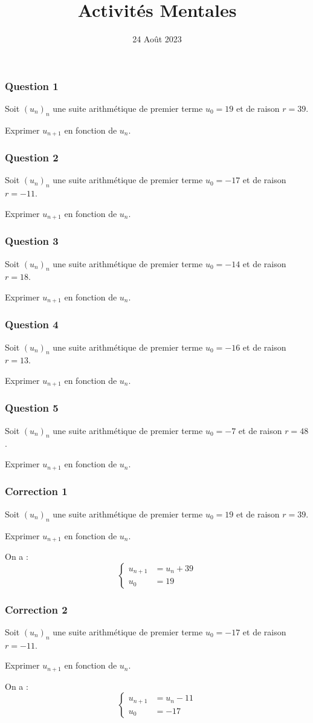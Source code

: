\documentclass[15pt, mathserif]{beamer}
\title{Activités Mentales}
\date{24 Août 2023}
\begin{document}
\begin{frame}
    \titlepage
\end{frame}

\begin{frame} 
	\frametitle{Question 1}
Soit $(u_n)_n$ une suite arithmétique de premier terme $u_0=19$ et de raison $r=39$. 
 
 Exprimer $u_{n+1}$ en fonction de $u_n$.\end{frame}


\begin{frame} 
	\frametitle{Question 2}
Soit $(u_n)_n$ une suite arithmétique de premier terme $u_0=-17$ et de raison $r=-11$. 
 
 Exprimer $u_{n+1}$ en fonction de $u_n$.\end{frame}


\begin{frame} 
	\frametitle{Question 3}
Soit $(u_n)_n$ une suite arithmétique de premier terme $u_0=-14$ et de raison $r=18$. 
 
 Exprimer $u_{n+1}$ en fonction de $u_n$.\end{frame}


\begin{frame} 
	\frametitle{Question 4}
Soit $(u_n)_n$ une suite arithmétique de premier terme $u_0=-16$ et de raison $r=13$. 
 
 Exprimer $u_{n+1}$ en fonction de $u_n$.\end{frame}


\begin{frame} 
	\frametitle{Question 5}
Soit $(u_n)_n$ une suite arithmétique de premier terme $u_0=-7$ et de raison $r=48$. 
 
 Exprimer $u_{n+1}$ en fonction de $u_n$.\end{frame}


\begin{frame}
\vspace{-10mm}
	\frametitle{Correction 1}
Soit $(u_n)_n$ une suite arithmétique de premier terme $u_0=19$ et de raison $r=39$. 
 
 Exprimer $u_{n+1}$ en fonction de $u_n$. 
 
 On a : $$ \left\{ 
 \begin{array}{ll} 
 u_{n+1} &= u_n +39 \\ 
 u_0 & = 19 
 \end{array} 
 \right. $$ 
 \end{frame}


\begin{frame}
\vspace{-10mm}
	\frametitle{Correction 2}
Soit $(u_n)_n$ une suite arithmétique de premier terme $u_0=-17$ et de raison $r=-11$. 
 
 Exprimer $u_{n+1}$ en fonction de $u_n$. 
 
 On a : $$ \left\{ 
 \begin{array}{ll} 
 u_{n+1} &= u_n -11 \\ 
 u_0 & = -17 
 \end{array} 
 \right. $$ 
 \end{frame}
\end{document}
